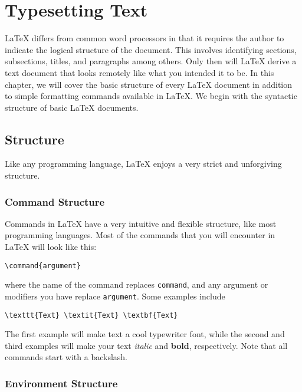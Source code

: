 \chapter{Typesetting Text}
\label{cha:typesetting-text}

\LaTeX{} differs from common word processors in that it requires the
author to indicate the logical structure of the document.  This
involves identifying sections, subsections, titles, and paragraphs
among others.  Only then will \LaTeX{} derive a text document that
looks remotely like what you intended it to be.  In this chapter, we
will cover the basic structure of every \LaTeX{} document in addition
to simple formatting commands available in \LaTeX{}.  We begin with
the syntactic structure of basic \LaTeX{} documents.

\section{Structure}
\label{sec:structure}

Like any programming language, \LaTeX{} enjoys a very strict and
unforgiving structure.

\subsection{Command Structure}
\label{sec:command-structure}

Commands in \LaTeX{} have a very intuitive and flexible structure,
like most programming languages.  Most of the commands that you will
encounter in \LaTeX{} will look like this:
\begin{verbatim}
\command{argument}
\end{verbatim}
where the name of the command replaces \texttt{command}, and any
argument or modifiers you have replace \texttt{argument}.  Some
examples include
\begin{verbatim}
\texttt{Text} \textit{Text} \textbf{Text}
\end{verbatim}
The first example will make text a cool
typewriter font, while the second and third examples will make your
text \textit{italic} and \textbf{bold}, respectively.  Note that all
commands start with a backslash.

\subsection{Environment Structure}
\label{sec:envir-struct}

